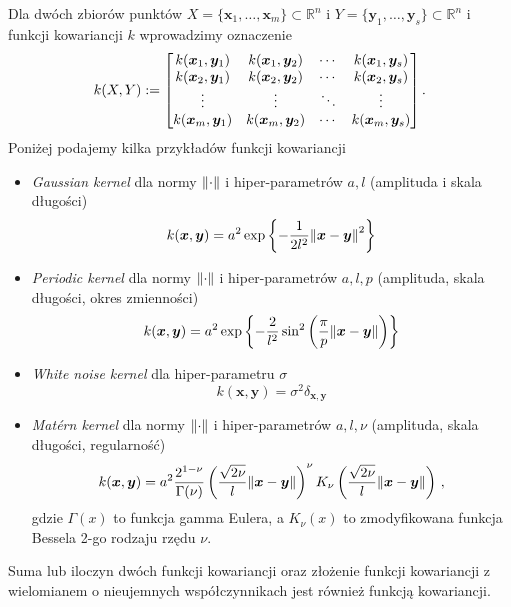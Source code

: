 \documentclass{myclass}
\numberwithin{equation}{subsection}
\begin{document}
Dla dwóch zbiorów punktów \(X = \{\bm{x}_1,\ldots,\bm{x}_m\} \subset \mathbb{R}^n\) i \(Y =
\{\bm{y}_1,\ldots,\bm{y}_s\} \subset \mathbb{R}^n\) i funkcji kowariancji \(k\) wprowadzimy
oznaczenie
\[
k(X,Y) := \mqty[k(\bm{x}_1, \bm{y}_1) & k(\bm{x}_1, \bm{y}_2) & \cdots & k(\bm{x}_1, \bm{y}_s)\\
k(\bm{x}_2, \bm{y}_1) & k(\bm{x}_2, \bm{y}_2) & \cdots & k(\bm{x}_2, \bm{y}_s)\\
\vdots & \vdots & \ddots & \vdots\\
k(\bm{x}_m, \bm{y}_1) & k(\bm{x}_m, \bm{y}_2) & \cdots & k(\bm{x}_m, \bm{y}_s)\\]\,.
\]
Poniżej podajemy kilka przykładów funkcji kowariancji
\begin{itemize}
    \item \textit{Gaussian kernel} dla normy \(\norm{\cdot}\) i hiper-parametrów \(a,l\) (amplituda
    i skala długości)
    \[
    k(\bm{x}, \bm{y}) = a^2\exp\left\{-\frac{1}{2l^2}\norm{\bm{x} - \bm{y}}^2\right\}
    \]
    
    \item \textit{Periodic kernel} dla normy \(\norm{\cdot}\) i hiper-parametrów \(a, l, p\)
    (amplituda, skala długości, okres zmienności)
    \[
    k(\bm{x},\bm{y}) = a^2\exp\left\{-\frac{2}{l^2}\sin^2\left(\frac{\pi}{p}\norm{\bm{x} - \bm{y}}\right)\right\}
    \]
    
    \item \textit{White noise kernel} dla hiper-parametru \(\sigma\)
    \[
    k(\bm{x},\bm{y}) = \sigma^2 \delta_{\bm{x},\bm{y}}
    \]
    
    \item \textit{Mat\'ern kernel} dla normy \(\norm{\cdot}\) i hiper-parametrów \(a, l, \nu\)
    (amplituda, skala długości, regularność)
    \[
    k(\bm{x},\bm{y}) = a^2 \frac{2^{1-\nu}}{\Gamma(\nu)}\left(\frac{\sqrt{2\nu}}{l}\norm{\bm{x} - \bm{y}}\right)^\nu K_\nu\left(\frac{\sqrt{2\nu}}{l}\norm{\bm{x} - \bm{y}}\right)\,,
    \]
    gdzie \(\Gamma(x)\) to funkcja gamma Eulera, a \(K_\nu(x)\) to zmodyfikowana funkcja Bessela
    2-go rodzaju rzędu \(\nu\).

\end{itemize}

\begin{theorem}
Suma lub iloczyn dwóch funkcji kowariancji oraz złożenie funkcji kowariancji z wielomianem o
nieujemnych współczynnikach jest również funkcją kowariancji.
\end{theorem}
\end{document}
